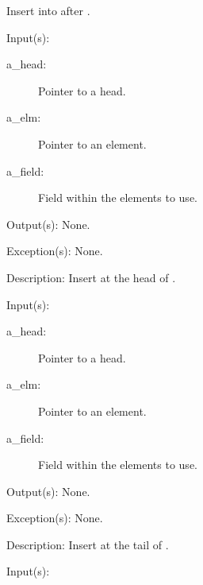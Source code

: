 \begin{capi}
\begin{capilist}
		Insert  into  after .
	\end{capilist}
\label{ql_head_insert}
	\begin{capilist}
	\item[Input(s): ]
		\begin{description}\item[]
		\item[a\_head: ]
			Pointer to a  head.
		\item[a\_elm: ]
			Pointer to an element.
		\item[a\_field: ]
			Field within the  elements to use.
		\end{description}
	\item[Output(s): ] None.
	\item[Exception(s): ] None.
	\item[Description: ]
		Insert  at the head of .
	\end{capilist}
\label{ql_tail_insert}
	\begin{capilist}
	\item[Input(s): ]
		\begin{description}\item[]
		\item[a\_head: ]
			Pointer to a \classname{ql} head.
		\item[a\_elm: ]
			Pointer to an element.
		\item[a\_field: ]
			Field within the  elements to use.
		\end{description}
	\item[Output(s): ] None.
	\item[Exception(s): ] None.
	\item[Description: ]
		Insert  at the tail of \cvar{a\_head}.
	\end{capilist}
\label{ql_remove}
	\begin{capilist}
	\item[Input(s): ]

\end{capilist}
\end{capi}

